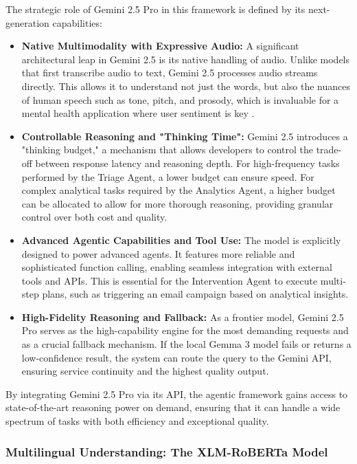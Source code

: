 The strategic role of Gemini 2.5 Pro in this framework is defined by its next-generation capabilities:
\begin{itemize}
    \item \textbf{Native Multimodality with Expressive Audio:} A significant architectural leap in Gemini 2.5 is its native handling of audio. Unlike models that first transcribe audio to text, Gemini 2.5 processes audio streams directly. This allows it to understand not just the words, but also the nuances of human speech such as tone, pitch, and prosody, which is invaluable for a mental health application where user sentiment is key \cite{FIND_CITATION_PLEASE}.
    \item \textbf{Controllable Reasoning and "Thinking Time":} Gemini 2.5 introduces a "thinking budget," a mechanism that allows developers to control the trade-off between response latency and reasoning depth. For high-frequency tasks performed by the Triage Agent, a lower budget can ensure speed. For complex analytical tasks required by the Analytics Agent, a higher budget can be allocated to allow for more thorough reasoning, providing granular control over both cost and quality.
    \item \textbf{Advanced Agentic Capabilities and Tool Use:} The model is explicitly designed to power advanced agents. It features more reliable and sophisticated function calling, enabling seamless integration with external tools and APIs. This is essential for the Intervention Agent to execute multi-step plans, such as triggering an email campaign based on analytical insights.
    \item \textbf{High-Fidelity Reasoning and Fallback:} As a frontier model, Gemini 2.5 Pro serves as the high-capability engine for the most demanding requests and as a crucial fallback mechanism. If the local Gemma 3 model fails or returns a low-confidence result, the system can route the query to the Gemini API, ensuring service continuity and the highest quality output.
\end{itemize}
By integrating Gemini 2.5 Pro via its API, the agentic framework gains access to state-of-the-art reasoning power on demand, ensuring that it can handle a wide spectrum of tasks with both efficiency and exceptional quality.


\subsubsection{Multilingual Understanding: The XLM-RoBERTa Model}
\label{subsubsec:xlm-roberta}

